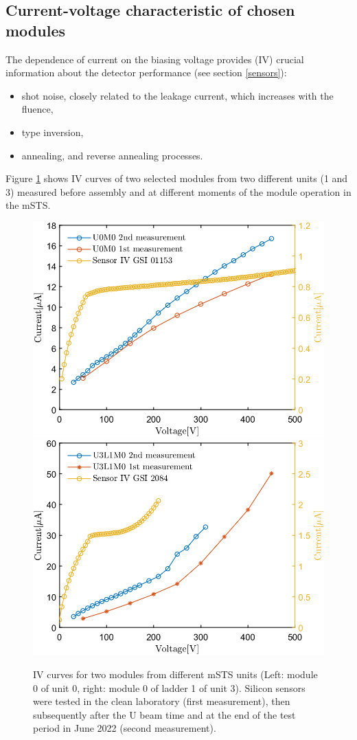 \subsection{Current-voltage characteristic of chosen modules}
The dependence of current on the biasing voltage provides (IV) crucial information about the detector performance (see section \ref{sensors}):
\begin{itemize}
    \item shot noise, closely related to the leakage current, which increases with the fluence,
    \item type inversion,
    \item annealing, and reverse annealing processes.
\end{itemize}
Figure \ref{fig_IV} shows IV curves of two selected modules from two different units (1 and 3) measured before assembly and at different moments of the module operation in the \gls{mSTS}.
\begin{figure}[!h]
\centering
\includegraphics[width=0.48\columnwidth]{Chapter6/DCS/images/IV/U0FEB1.png}
\includegraphics[width=0.48\columnwidth]{Chapter6/DCS/images/IV/U3L1FEB1.png}
\caption{IV curves for two modules from different \gls{mSTS} units (Left: module 0 of unit 0, right: module 0 of ladder 1 of unit 3). Silicon sensors were tested in the clean laboratory (first measurement), then subsequently after the U beam time and at the end of the test period in June 2022 (second measurement).}
\label{fig_IV}
\end{figure}
